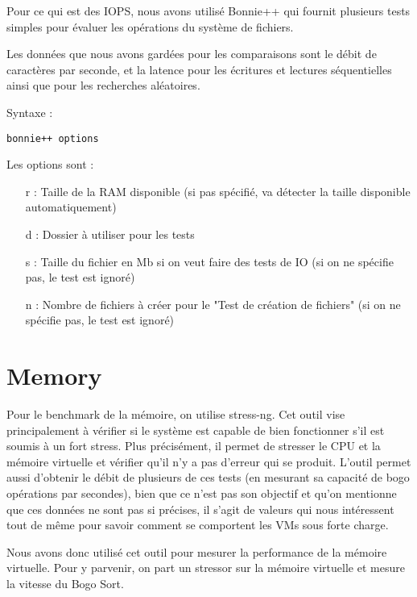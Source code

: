 Pour ce qui est des IOPS, nous avons utilisé Bonnie++ qui fournit plusieurs tests simples pour évaluer les opérations du système de fichiers. \newline

Les données que nous avons gardées pour les comparaisons sont le débit de caractères par seconde, et la latence pour les écritures et lectures séquentielles ainsi que pour les recherches aléatoires. \newline

Syntaxe : 
\begin{verbatim}
bonnie++ options
\end{verbatim}
Les options sont : 
\begin{itemize}
  \item [r] : Taille de la RAM disponible (si pas spécifié, va détecter la taille disponible automatiquement)
  \item [d] : Dossier à utiliser pour les tests
  \item [s] : Taille du fichier en Mb si on veut faire des tests de IO (si on ne spécifie pas, le test est ignoré)
  \item [n] : Nombre de fichiers à créer pour le "Test de création de fichiers" (si on ne spécifie pas, le test est ignoré) \newline
\end{itemize}


\section{Memory}

Pour le benchmark de la mémoire, on utilise stress-ng. Cet outil vise principalement à vérifier si le système est capable de bien fonctionner s'il est soumis à un fort stress. Plus précisément, il permet de stresser le CPU et la mémoire virtuelle et vérifier qu'il n'y a pas d'erreur qui se produit. L'outil permet aussi d'obtenir le débit de plusieurs de ces tests (en mesurant sa capacité de bogo opérations par secondes), bien que ce n'est pas son objectif et qu'on mentionne que ces données ne sont pas si précises, il s'agit de valeurs qui nous intéressent tout de même pour savoir comment se comportent les VMs sous forte charge. \newline

Nous avons donc utilisé cet outil pour mesurer la performance de la mémoire virtuelle. Pour y parvenir, on part un stressor sur la mémoire virtuelle et mesure la vitesse du Bogo Sort. \newline

